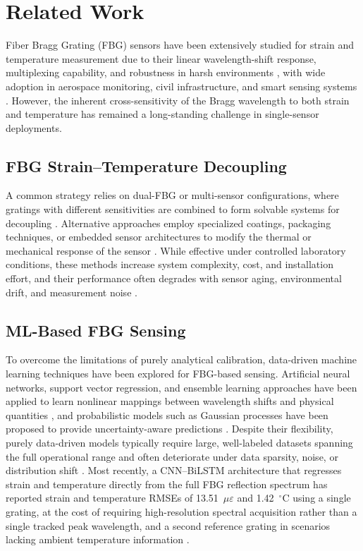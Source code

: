 \documentclass[journal,twoside,web]{ieeecolor}
\begin{document}
\section{Related Work}
\label{sec:related_work}

Fiber Bragg Grating (FBG) sensors have been extensively studied for strain
and temperature measurement due to their linear wavelength-shift response,
multiplexing capability, and robustness in harsh environments
\cite{b1,b2,b3,b7,b8,b10}, with wide adoption in aerospace monitoring, civil
infrastructure, and smart sensing systems \cite{b4,b6,b9,b12}. However, the
inherent cross-sensitivity of the Bragg wavelength to both strain and
temperature has remained a long-standing challenge in single-sensor
deployments.

\subsection{FBG Strain--Temperature Decoupling}

A common strategy relies on dual-FBG or multi-sensor configurations, where
gratings with different sensitivities are combined to form solvable systems
for decoupling \cite{b14,b15,b17}. Alternative approaches employ specialized
coatings, packaging techniques, or embedded sensor architectures to modify
the thermal or mechanical response of the sensor \cite{b18,b20}. While
effective under controlled laboratory conditions, these methods increase
system complexity, cost, and installation effort, and their performance
often degrades with sensor aging, environmental drift, and measurement
noise \cite{b6,b9,b16}.

\subsection{ML-Based FBG Sensing}

To overcome the limitations of purely analytical calibration, data-driven
machine learning techniques have been explored for FBG-based sensing.
Artificial neural networks, support vector regression, and ensemble learning
approaches have been applied to learn nonlinear mappings between wavelength
shifts and physical quantities \cite{b19,b21}, and probabilistic models such
as Gaussian processes have been proposed to provide uncertainty-aware
predictions \cite{b22}. Despite their flexibility, purely data-driven models
typically require large, well-labeled datasets spanning the full operational
range and often deteriorate under data sparsity, noise, or distribution
shift \cite{b23,b24,b25,b37}. Most recently, a CNN--BiLSTM architecture that
regresses strain and temperature directly from the full FBG reflection
spectrum has reported strain and temperature RMSEs of 13.51~$\mu\varepsilon$
and 1.42~$^\circ$C using a single grating, at the cost of requiring
high-resolution spectral acquisition rather than a single tracked peak
wavelength, and a second reference grating in scenarios lacking ambient
temperature information \cite{b38}.
\end{document}
